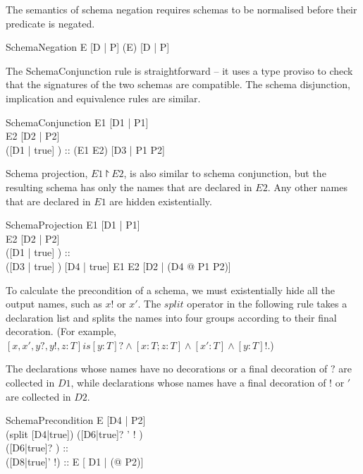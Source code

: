 \documentclass{entcs}
\newcommand{\sexprUnfoldsTo}{\mathrel{=_{se}}}
\newcommand{\is}{\mathrel{is}}
\begin{document}
The semantics of schema negation requires schemas to be
normalised before their predicate is negated.

\begin{zedrule}{SchemaNegation}
  E \sexprUnfoldsTo [D | P]
\derives
  (\lnot E) \sexprUnfoldsTo [D | \lnot P]
\end{zedrule}

The SchemaConjunction rule is straightforward -- it uses a type
proviso to check that the signatures of the two schemas are compatible.
The schema disjunction, implication and equivalence rules are similar.

\begin{zedrule}{SchemaConjunction}
  E1 \sexprUnfoldsTo [D1 | P1] \\
  E2 \sexprUnfoldsTo [D2 | P2] \\
  \proviso ([D1 | true] \land [D2 | true]) :: \power [D3 | true]
\derives
  (E1 \land E2) \sexprUnfoldsTo [D3 | P1 \land P2]
\end{zedrule}

Schema projection, $E1 \project E2$, is also similar to schema conjunction,
but the resulting schema has only the names that are declared in $E2$.
Any other names that are declared in $E1$ are hidden existentially.

\begin{zedrule}{SchemaProjection}
  E1 \sexprUnfoldsTo [D1 | P1] \\
  E2 \sexprUnfoldsTo [D2 | P2] \\
  \proviso ([D1 | true] \land [D2 | true]) :: \power [D3 | true] \\
  \proviso ([D3 | true] \schemaminus [D2 | true]) \is [D4 | true]
\derives
  E1 \project E2 \sexprUnfoldsTo [D2 | (\exists D4 @ P1 \land P2)]
\end{zedrule}

To calculate the precondition of a schema, we must existentially hide
all the output names, such as $x!$ or $x'$.  The $split$ operator in
the following rule takes a declaration list and splits the names into
four groups according to their final decoration.  (For example, $[x,
x', y?, y!, z:T] \is [y:T]? \land [x:T; z:T] \land [x':T]\land
[y:T]!$.)

The declarations whose names have no decorations or a final decoration
of $?$ are collected in $D1$, while declarations whose names have a
final decoration of $!$ or $'$ are collected in $D2$.

\begin{zedrule}{SchemaPrecondition}
  E \sexprUnfoldsTo [D4 | P2] \\
  \proviso (split [D4|true]) \is ([D6|true]? \land [D7|true] \land
                                  [D8|true]' \land [D9|true]! ) \\
  \proviso ([D6|true]? \land [D7|true]) :: \power [D1|true] \\
  \proviso ([D8|true]' \land [D9|true]!) :: \power [D2|true]
\derives
  \pre E \sexprUnfoldsTo [ D1 | (\exists [D2|true] @ P2)]
\end{zedrule}
\end{document}
